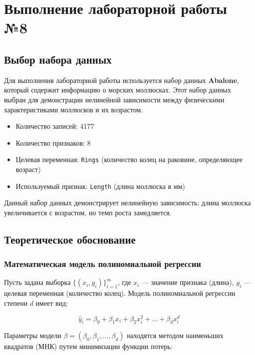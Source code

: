 \chapter{Выполнение лабораторной работы №8}
\label{ch:lab8}

\section{Выбор набора данных}

Для выполнения лабораторной работы используется набор данных \textbf{Abalone}, который содержит информацию о морских моллюсках. Этот набор данных выбран для демонстрации нелинейной зависимости между физическими характеристиками моллюсков и их возрастом.

\begin{itemize}
    \item Количество записей: 4177
    \item Количество признаков: 8
    \item Целевая переменная: \texttt{Rings} (количество колец на раковине, определяющее возраст)
    \item Используемый признак: \texttt{Length} (длина моллюска в мм)
\end{itemize}

Данный набор данных демонстрирует нелинейную зависимость: длина моллюска увеличивается с возрастом, но темп роста замедляется.

\section{Теоретическое обоснование}

\subsection{Математическая модель полиномиальной регрессии}

Пусть задана выборка $\{(x_i, y_i)\}_{i=1}^m$, где $x_i$ — значение признака (длина), $y_i$ — целевая переменная (количество колец). Модель полиномиальной регрессии степени $d$ имеет вид:

\begin{equation}
\hat{y}_i = \beta_0 + \beta_1 x_i + \beta_2 x_i^2 + \ldots + \beta_d x_i^d
\label{eq:poly_model}
\end{equation}

Параметры модели $\beta = (\beta_0, \beta_1, \ldots, \beta_d)$ находятся методом наименьших квадратов (МНК) путем минимизации функции потерь:

